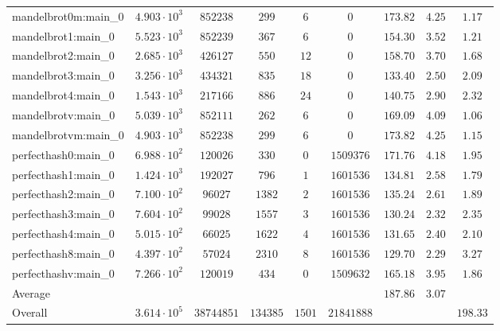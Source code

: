 \begin{tabular}{|l|c|c|c|c|c|c|c|c|}
mandelbrot0m:main\_0           & $ 4.903 \cdot 10^{3} $ & $ 852238   $ & $ 299    $ & $ 6    $ & $ 0        $ & $ 173.82      $ & $ 4.25    $ & $ 1.17    $ \\
mandelbrot1:main\_0            & $ 5.523 \cdot 10^{3} $ & $ 852239   $ & $ 367    $ & $ 6    $ & $ 0        $ & $ 154.30      $ & $ 3.52    $ & $ 1.21    $ \\
mandelbrot2:main\_0            & $ 2.685 \cdot 10^{3} $ & $ 426127   $ & $ 550    $ & $ 12   $ & $ 0        $ & $ 158.70      $ & $ 3.70    $ & $ 1.68    $ \\
mandelbrot3:main\_0            & $ 3.256 \cdot 10^{3} $ & $ 434321   $ & $ 835    $ & $ 18   $ & $ 0        $ & $ 133.40      $ & $ 2.50    $ & $ 2.09    $ \\
mandelbrot4:main\_0            & $ 1.543 \cdot 10^{3} $ & $ 217166   $ & $ 886    $ & $ 24   $ & $ 0        $ & $ 140.75      $ & $ 2.90    $ & $ 2.32    $ \\
mandelbrotv:main\_0            & $ 5.039 \cdot 10^{3} $ & $ 852111   $ & $ 262    $ & $ 6    $ & $ 0        $ & $ 169.09      $ & $ 4.09    $ & $ 1.06    $ \\
mandelbrotvm:main\_0           & $ 4.903 \cdot 10^{3} $ & $ 852238   $ & $ 299    $ & $ 6    $ & $ 0        $ & $ 173.82      $ & $ 4.25    $ & $ 1.15    $ \\
perfecthash0:main\_0           & $ 6.988 \cdot 10^{2} $ & $ 120026   $ & $ 330    $ & $ 0    $ & $ 1509376  $ & $ 171.76      $ & $ 4.18    $ & $ 1.95    $ \\
perfecthash1:main\_0           & $ 1.424 \cdot 10^{3} $ & $ 192027   $ & $ 796    $ & $ 1    $ & $ 1601536  $ & $ 134.81      $ & $ 2.58    $ & $ 1.79    $ \\
perfecthash2:main\_0           & $ 7.100 \cdot 10^{2} $ & $ 96027    $ & $ 1382   $ & $ 2    $ & $ 1601536  $ & $ 135.24      $ & $ 2.61    $ & $ 1.89    $ \\
perfecthash3:main\_0           & $ 7.604 \cdot 10^{2} $ & $ 99028    $ & $ 1557   $ & $ 3    $ & $ 1601536  $ & $ 130.24      $ & $ 2.32    $ & $ 2.35    $ \\
perfecthash4:main\_0           & $ 5.015 \cdot 10^{2} $ & $ 66025    $ & $ 1622   $ & $ 4    $ & $ 1601536  $ & $ 131.65      $ & $ 2.40    $ & $ 2.10    $ \\
perfecthash8:main\_0           & $ 4.397 \cdot 10^{2} $ & $ 57024    $ & $ 2310   $ & $ 8    $ & $ 1601536  $ & $ 129.70      $ & $ 2.29    $ & $ 3.27    $ \\
perfecthashv:main\_0           & $ 7.266 \cdot 10^{2} $ & $ 120019   $ & $ 434    $ & $ 0    $ & $ 1509632  $ & $ 165.18      $ & $ 3.95    $ & $ 1.86    $ \\
\hline
Average                        & $                    $ & $          $ & $        $ & $      $ & $          $ & $ 187.86      $ & $ 3.07    $ & $         $ \\
\hline
Overall                        & $ 3.614 \cdot 10^{5} $ & $ 38744851 $ & $ 134385 $ & $ 1501 $ & $ 21841888 $ & $             $ & $         $ & $ 198.33  $ \\
\hline
\end{tabular}

